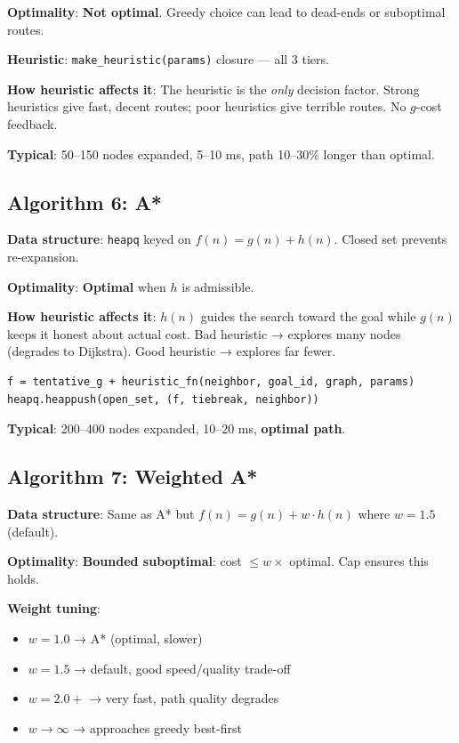 \documentclass[11pt,a4paper]{article}
\begin{document}
\textbf{Optimality}: \textbf{Not optimal}. Greedy choice can lead to dead-ends or suboptimal routes.

\textbf{Heuristic}: \texttt{make\_heuristic(params)} closure — all 3 tiers.

\textbf{How heuristic affects it}: The heuristic is the \textit{only} decision factor. Strong heuristics give fast, decent routes; poor heuristics give terrible routes. No $g$-cost feedback.

\textbf{Typical}: 50–150 nodes expanded, 5–10 ms, path 10–30\% longer than optimal.

\subsection{Algorithm 6: A*}

\textbf{Data structure}: \texttt{heapq} keyed on $f(n) = g(n) + h(n)$. Closed set prevents re-expansion.

\textbf{Optimality}: \textbf{Optimal} when $h$ is admissible.

\textbf{How heuristic affects it}: $h(n)$ guides the search toward the goal while $g(n)$ keeps it honest about actual cost. Bad heuristic → explores many nodes (degrades to Dijkstra). Good heuristic → explores far fewer.

\begin{lstlisting}[caption={astar.py — core loop}]
f = tentative_g + heuristic_fn(neighbor, goal_id, graph, params)
heapq.heappush(open_set, (f, tiebreak, neighbor))
\end{lstlisting}

\textbf{Typical}: 200–400 nodes expanded, 10–20 ms, \textbf{optimal path}.

\subsection{Algorithm 7: Weighted A*}

\textbf{Data structure}: Same as A* but $f(n) = g(n) + w\cdot h(n)$ where $w=1.5$ (default).

\textbf{Optimality}: \textbf{Bounded suboptimal}: cost $\le w\times$ optimal. Cap ensures this holds.

\textbf{Weight tuning}:
\begin{itemize}[noitemsep]
  \item $w=1.0$ → A* (optimal, slower)
  \item $w=1.5$ → default, good speed/quality trade-off
  \item $w=2.0+$ → very fast, path quality degrades
  \item $w\to\infty$ → approaches greedy best-first
\end{itemize}
\end{document}
